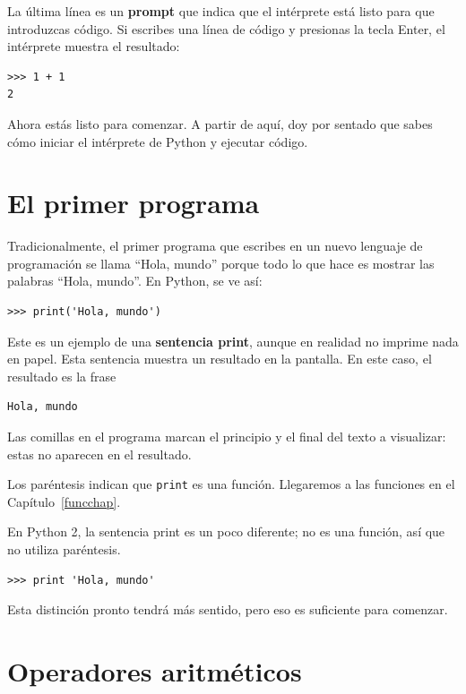 \documentclass[10pt]{book}
\begin{document}
La última línea es un {\bf prompt} que indica que el intérprete está listo
para que introduzcas código.
Si escribes una línea de código y presionas la tecla Enter, el intérprete
muestra el resultado:

\begin{verbatim}
>>> 1 + 1
2
\end{verbatim}
%
Ahora estás listo para comenzar.
A partir de aquí, doy por sentado que sabes cómo iniciar el intérprete de Python
y ejecutar código.


\section{El primer programa}
\label{hello}

Tradicionalmente, el primer programa que escribes en un nuevo lenguaje
de programación se llama ``Hola, mundo'' porque todo lo que hace es mostrar
las palabras ``Hola, mundo''.  En Python, se ve así:

\begin{verbatim}
>>> print('Hola, mundo')
\end{verbatim}
%
Este es un ejemplo de una {\bf sentencia print}, aunque
en realidad no imprime nada en papel.  Esta sentencia muestra un resultado en la
pantalla.  En este caso, el resultado es la frase

\begin{verbatim}
Hola, mundo
\end{verbatim}
%
Las comillas en el programa marcan el principio y el final
del texto a visualizar: estas no aparecen en el resultado.

Los paréntesis indican que {\tt print} es una función.  Llegaremos
a las funciones en el Capítulo~\ref{funcchap}.
 

En Python 2, la sentencia print es un poco diferente; no es
una función, así que no utiliza paréntesis.

\begin{verbatim}
>>> print 'Hola, mundo'
\end{verbatim}
%
Esta distinción pronto tendrá más sentido, pero eso es suficiente para
comenzar.


\section{Operadores aritméticos}
\end{document}
